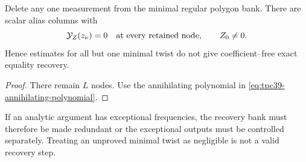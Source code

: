 \begin{corollary}[Deletion no--go]
\label{cor:tpc39-deletion-no-go}
Delete any one measurement from the minimal regular polygon bank.  There
are scalar alias columns with
\begin{equation}
 \mathcal Y_Z(z_\nu)=0
 \quad\text{at every retained node},
 \qquad Z_0\ne0.
 \label{eq:tpc39-deletion-witness}
\end{equation}
Hence estimates for all but one minimal twist do not give
coefficient--free exact equality recovery.
\end{corollary}

\begin{proof}
There remain \(L\) nodes.  Use the annihilating polynomial in
\eqref{eq:tpc39-annihilating-polynomial}.
\end{proof}

If an analytic argument has exceptional frequencies, the recovery bank
must therefore be made redundant or the exceptional outputs must be
controlled separately.  Treating an unproved minimal twist as negligible
is not a valid recovery step.
